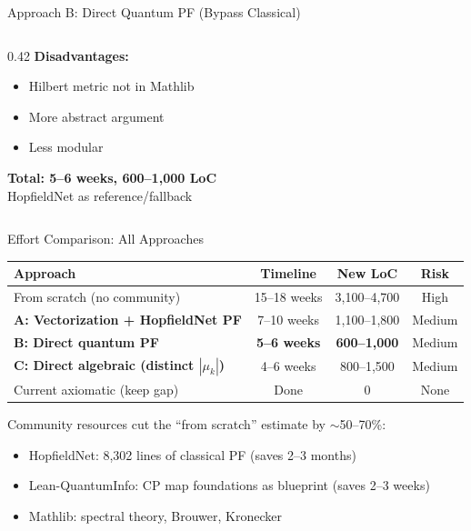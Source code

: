 \documentclass[aspectratio=169,10pt]{beamer}
\begin{document}
\begin{frame}{Approach B: Direct Quantum PF (Bypass Classical)}
\begin{columns}[T]
\begin{column}{0.42\textwidth}
\vspace{0.3em}
\textbf{Disadvantages:}
\begin{itemize}\small\itemsep1pt
  \item \textcolor{softred}{Hilbert metric not in Mathlib}
  \item \textcolor{softred}{More abstract argument}
  \item \textcolor{softred}{Less modular}
\end{itemize}

\vspace{0.3em}
\textbf{Total: 5--6 weeks, 600--1,000 LoC}\\
{\footnotesize HopfieldNet as reference/fallback}
\end{column}
\end{columns}
\end{frame}

\begin{frame}{Effort Comparison: All Approaches}

\begin{center}
\renewcommand{\arraystretch}{1.15}
\begin{tabular}{>{\small}l >{\small}c >{\small}c >{\small}c}
\textbf{Approach} & \textbf{Timeline} & \textbf{New LoC} & \textbf{Risk} \\
\midrule
\textcolor{dimwhite}{From scratch (no community)} & \textcolor{softred}{15--18 weeks} & \textcolor{softred}{3,100--4,700} & High \\
\midrule
\textbf{A: Vectorization + HopfieldNet PF} & 7--10 weeks & 1,100--1,800 & Medium \\
\textbf{B: Direct quantum PF} & \textcolor{leangreen}{\textbf{5--6 weeks}} & \textcolor{leangreen}{\textbf{600--1,000}} & Medium \\
\textbf{C: Direct algebraic (distinct $|\mu_k|$)} & 4--6 weeks & 800--1,500 & Medium \\
\midrule
\textcolor{dimwhite}{Current axiomatic (keep gap)} & \textcolor{leangreen}{Done} & \textcolor{leangreen}{0} & None \\
\end{tabular}
\end{center}

\vspace{0.3em}
Community resources cut the ``from scratch'' estimate by $\sim$50--70\%:
\begin{itemize}\small\itemsep1pt
  \item HopfieldNet: 8,302 lines of classical PF (saves 2--3 months)
  \item Lean-QuantumInfo: CP map foundations as blueprint (saves 2--3 weeks)
  \item Mathlib: spectral theory, Brouwer, Kronecker
\end{itemize}
\end{frame}
\end{document}
